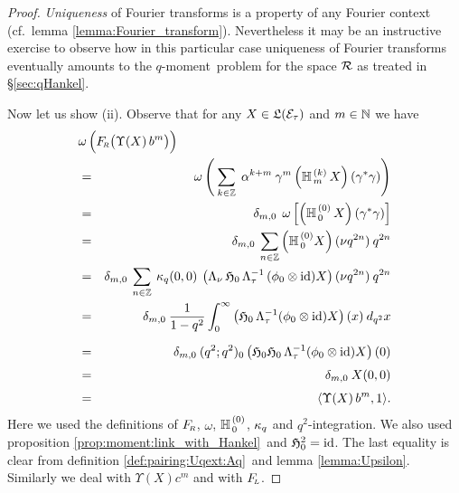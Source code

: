 \begin{proof}
{\em Uniqueness\/} of Fourier transforms is a property of any Fourier context
(cf.\ lemma \ref{lemma:Fourier_transform}).
Nevertheless it may be an instructive exercise to observe how in this particular case
uniqueness of Fourier transforms eventually amounts to the \mbox{$q$-moment}\
problem for the space $\mathcal R$ as treated in \S\ref{sec:qHankel}\@.

Now let us show (ii). Observe that for any $X\in \mathfrak{L}(\mathcal E_\tau)$ and $m\in \mathbb{N}$ we have
\begin{eqnarray*}
\lefteqn{ \omega\left(\vertL \FRabb \!\left(\vertM\Upsilon(X)\, b^m\right) \right)}
\\&=&
     \omega\left(\: \sum_{k\in\ZZ} \; \alpha^{k+m} \: \gamma^m
       \left(\YaH{m}{k}\,X\right)(\gamma^*\gamma) \right)
\\&=&
     \delta_{m,0} \; \, \omega \left[
            \left(\YaH{0}{0}\,X\right)(\gamma^*\gamma) \right]
\\&=&
     \delta_{m,0}\: \sum_{n \in\ZZ} \left(\YaH{0}{0} X \right) (\nu q^{2n})\: q^{2n}
\\&=&
     \delta_{m,0}\: \sum_{n\in\ZZ} \: \kq(0,0) \: \left( \Lambda_\nu \, \holH{0}
          \, \Lambda_\tau^{-1}\,(\evzero \tens \id) X \right) (\nu q^{2n})\: q^{2n}
\\&=&
     \delta_{m,0}\: \frac{1}{1-q^2} \int_0^\infty  \left(\holH{0} \, \Lambda_\tau^{-1}
                 (\evzero \tens \id) X \right)(x) \: d_{q^2}x
\\&=&
     \vertXL \delta_{m,0}\: (q^2;q^2)_0  \left(\holH{0}\holH{0} \, \Lambda_\tau^{-1}
                 (\evzero \tens \id) X\right)(0)
\\&=&
     \vertL \delta_{m,0}\: X(0,0)
\\&=&
     \vertL\pair{\Upsilon(X)\, b^m}{1}.
\end{eqnarray*}
Here we used the definitions of $F_{\!\scriptscriptstyle R}$, $\omega$, $\mathbb{H}_{\,0}^{\,(0)}$, $\kappa_q$
and \mbox{$q^2$-integration}\@.
We also used proposition \ref{prop:moment:link_with_Hankel}\ and $\mathfrak{H}_{0}^2 = \mbox{\rm id}$.
The last equality is clear from definition \ref{def:pairing:Uqext:Aq}\
and lemma \ref{lemma:Upsilon}\@.
Similarly we deal with $\Upsilon(X) c^m$ and with $F_{\!\scriptscriptstyle L}$.
\vspace{2ex}



\end{proof}
